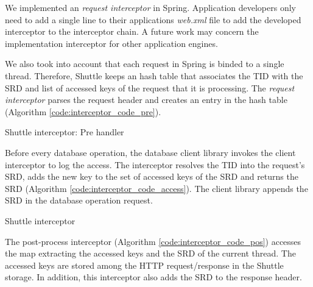 We implemented an \emph{request interceptor} in Spring. Application developers only need to add a single line to their applications \emph{web.xml} file to add the developed interceptor to the interceptor chain. A future work may concern the implementation interceptor for other application engines.

We also took into account that each request in Spring is binded to a single thread. Therefore, Shuttle keeps an hash table that associates the \acf{TID} with the \acf{SRD} and list of accessed keys of the request that it is processing. The \emph{request interceptor} parses the request header and creates an entry in the hash table (Algorithm \ref{code:interceptor_code_pre}).


\begin{algorithm}
\DontPrintSemicolon{}

	\BlankLine
	\caption{Shuttle interceptor: Pre handler}
	\label{code:interceptor_code_pre}
\end{algorithm}

Before every database operation, the database client library invokes the client interceptor to log the access. The interceptor resolves the \acf{TID} into the request's \ac{SRD}, adds the new key to the set of accessed keys of the \ac{SRD} and returns the \ac{SRD} (Algorithm \ref{code:interceptor_code_access}). The client library appends the \ac{SRD} in the database operation request. 


\begin{algorithm}
\DontPrintSemicolon{}
	
\caption{Shuttle interceptor}
\label{code:interceptor_code_access}
\end{algorithm}

The post-process interceptor (Algorithm \ref{code:interceptor_code_pos}) accesses the map extracting the accessed keys and the \ac{SRD} of the current thread. The accessed keys are stored among the \ac{HTTP} request/response in the Shuttle storage. In addition, this interceptor also adds the \ac{SRD} to the response header.

